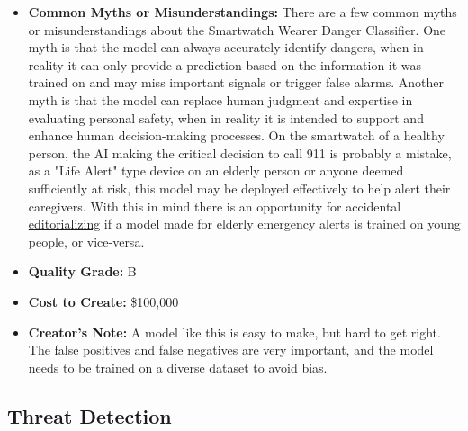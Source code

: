 \begin{itemize}
    \item \textbf{Common Myths or Misunderstandings:} There are a few common myths or misunderstandings about the Smartwatch Wearer Danger Classifier. One myth is that the model can always accurately identify dangers, when in reality it can only provide a prediction based on the information it was trained on and may miss important signals or trigger false alarms. Another myth is that the model can replace human judgment and expertise in evaluating personal safety, when in reality it is intended to support and enhance human decision-making processes. On the smartwatch of a healthy person, the AI making the critical decision to call 911 is probably a mistake, as a "Life Alert" type device on an elderly person or anyone deemed sufficiently at risk, this model may be deployed effectively to help alert their caregivers. With this in mind there is an opportunity for accidental \hyperref[sec:janitor]{editorializing} if a model made for elderly emergency alerts is trained on young people, or vice-versa.
    \item \textbf{Quality Grade:} B
    \item \textbf{Cost to Create:} \$100,000
    \item \textbf{Creator's Note:} A model like this is easy to make, but hard to get right. The false positives and false negatives are very important, and the model needs to be trained on a diverse dataset to avoid bias. 
\end{itemize}

\subsection{Threat Detection}

